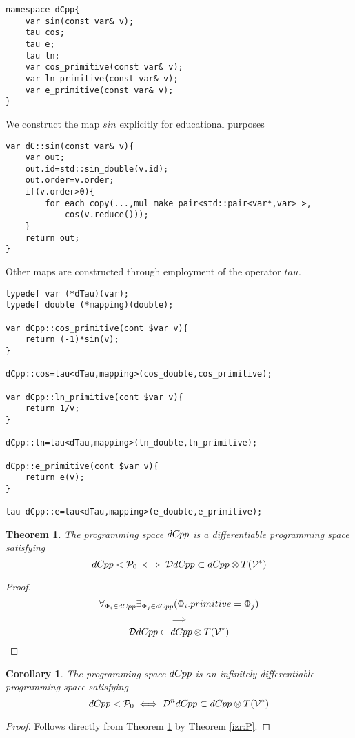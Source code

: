 \documentclass{article}
\newcommand{\VV}{\mathcal{V}}
\newcommand{\dP}{\mathcal{P}}
\newcommand{\DD}{\mathcal{D}}
\newcommand{\dCpp}{dC\nolinebreak\hspace{-.05em}\raisebox{.4ex}{\tiny\bf +}\nolinebreak\hspace{-.10em}\raisebox{.4ex}{\tiny\bf p}}
\def\dCpp{{dC\nolinebreak[4]\hspace{-.05em}pp}}
\newtheorem{izrek}{Theorem}[section]
\newtheorem{corollary}{Corollary}[section]
\begin{document}
\begin{lstlisting}
namespace dCpp{
    var sin(const var& v);
    tau cos;
    tau e;
    tau ln;
    var cos_primitive(const var& v);
    var ln_primitive(const var& v);
    var e_primitive(const var& v);
}
\end{lstlisting}

We construct the map $sin$ explicitly for educational purposes

\begin{lstlisting}
var dC::sin(const var& v){
    var out;
    out.id=std::sin_double(v.id);
    out.order=v.order;
    if(v.order>0){
    	for_each_copy(...,mul_make_pair<std::pair<var*,var> >,
    		cos(v.reduce()));
    }
    return out;
}
\end{lstlisting}

Other maps are constructed through employment of the operator $tau$.


\begin{lstlisting}
typedef var (*dTau)(var);
typedef double (*mapping)(double);

var dCpp::cos_primitive(cont $var v){
    return (-1)*sin(v);
}

dCpp::cos=tau<dTau,mapping>(cos_double,cos_primitive);

var dCpp::ln_primitive(cont $var v){
    return 1/v;
}

dCpp::ln=tau<dTau,mapping>(ln_double,ln_primitive);

dCpp::e_primitive(cont $var v){
    return e(v);
}

tau dCpp::e=tau<dTau,mapping>(e_double,e_primitive);

\end{lstlisting}

\begin{izrek}\label{izr:dCpp}
The programming space $\dCpp$ is a differentiable programming space satisfying
\begin{equation}
\dCpp<\dP_0\iff \DD \dCpp\subset \dCpp\otimes T(\VV^*)
\end{equation}
\end{izrek}
\begin{proof}
\begin{equation}
\forall_{\Phi_i\in \dCpp}\exists_{\Phi_j\in \dCpp}(\Phi_i.primitive=\Phi_j)
\end{equation}
$$\implies$$
\begin{equation}
\DD \dCpp\subset \dCpp\otimes T(\VV^*)
\end{equation}
\end{proof}
\begin{corollary}
The programming space $\dCpp$ is an infinitely-differentiable programming space satisfying
\begin{equation}
\dCpp<\dP_0\iff \DD^n \dCpp\subset \dCpp\otimes T(\VV^*)
\end{equation}
\end{corollary}
\begin{proof}
Follows directly from Theorem \ref{izr:dCpp} by Theorem \ref{izr:P}.
\end{proof}
\end{document}
